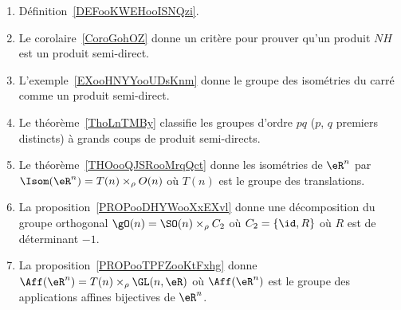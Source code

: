 
\begin{enumerate}
	\item
	      Définition~\ref{DEFooKWEHooISNQzi}.         %
	\item
	      Le corolaire~\ref{CoroGohOZ} donne un critère pour prouver qu'un produit \( NH\) est un produit semi-direct.
	\item
	      L'exemple~\ref{EXooHNYYooUDsKnm} donne le groupe des isométries du carré comme un produit semi-direct.
	\item
	      Le théorème~\ref{ThoLnTMBy} classifie les groupes d'ordre \( pq\) (\( p\), \( q\) premiers distincts) à grands coups de produit semi-directs.
	\item
	      Le théorème~\ref{THOooQJSRooMrqQct} donne les isométries de \( \eR^n\) par \( \Isom(\eR^n)=T(n)\times_{\rho} O(n)\) où \( T(n)\) est le groupe des translations.
	\item
	      La proposition~\ref{PROPooDHYWooXxEXvl} donne une décomposition du groupe orthogonal \( \gO(n)=\SO(n)\times_{\rho} C_2\) où \( C_2=\{ \id,R \}\) où \( R\) est de déterminant \( -1\).
	\item
	      La proposition~\ref{PROPooTPFZooKtFxhg} donne \( \Aff(\eR^n)=T(n)\times_{\rho}\GL(n,\eR)\) où \( \Aff(\eR^n)\) est le groupe des applications affines bijectives de \( \eR^n\).
\end{enumerate}
